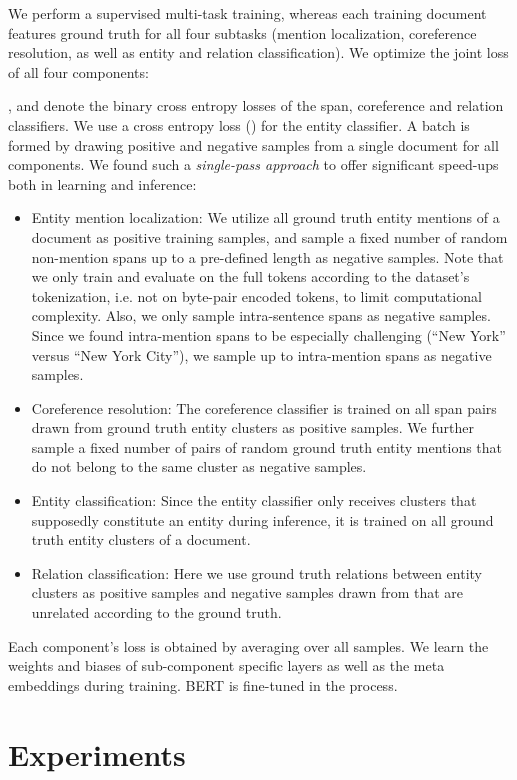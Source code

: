 \documentclass[11pt,a4paper]{article}
\begin{document}
We perform a supervised multi-task training, whereas each training document features ground truth for all four subtasks (mention localization, coreference resolution, as well as entity and relation classification). We optimize the joint loss of all four components:

,  and  denote the binary cross entropy losses of the span, coreference and relation classifiers. We use a cross entropy loss () for the entity classifier. A batch is formed by drawing positive and negative samples from a single document for all components. We found such a {\it single-pass approach} to offer significant speed-ups both in learning and inference:
\begin{itemize}
    \item Entity mention localization: We utilize all ground truth entity mentions  of a document as positive training samples, and sample a fixed number  of random non-mention spans up to a pre-defined length  as negative samples. Note that we only train and evaluate on the full tokens according to the dataset's tokenization, i.e. not on byte-pair encoded tokens, to limit computational complexity. Also, we only sample intra-sentence spans as negative samples. Since we found intra-mention spans to be especially challenging (\enquote{New York} versus \enquote{New York City}), we sample up to  intra-mention spans as negative samples.
    \item Coreference resolution: The coreference classifier is trained on all span pairs drawn from ground truth entity clusters  as positive samples. We further sample a fixed number  of pairs of random ground truth entity mentions that do not belong to the same cluster as negative samples. 
    \item Entity classification: Since the entity classifier only receives clusters that supposedly constitute an entity during inference, it is trained on all ground truth entity clusters of a document.
    \item Relation classification: Here we use ground truth relations between entity clusters as positive samples and  negative samples drawn from  that are unrelated according to the ground truth.
\end{itemize}

Each component's loss is obtained by averaging over all samples. We learn the weights and biases of sub-component specific layers as well as the meta embeddings during training. BERT is fine-tuned in the process.

\section{Experiments} \label{sec:experiments}
\end{document}
